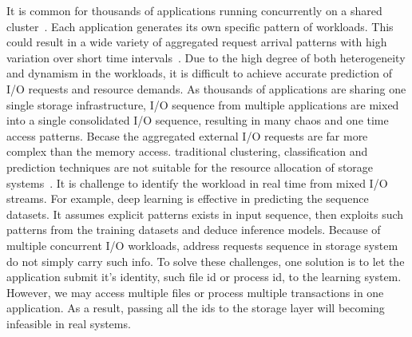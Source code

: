 It is common for thousands of applications running concurrently
on a shared cluster~\cite{stokely2012projecting}.
Each application generates its own specific pattern of workloads.
This could result in a wide variety of aggregated
request arrival patterns with high variation over short time intervals~\cite{reiss2012heterogeneity}.
Due to the high degree of both heterogeneity and dynamism in the workloads,
it is difficult to achieve accurate prediction of I/O requests and resource demands.
As thousands of applications are sharing one single storage infrastructure,
I/O sequence from multiple applications are mixed into a single consolidated I/O sequence,
resulting in many chaos and one time access patterns.
Becase the aggregated external I/O requests are far more complex than the memory access.
traditional clustering, classification and prediction techniques
are not suitable for the resource allocation of storage systems~\cite{ray2017high}.
It is challenge to identify the workload in real time from mixed I/O streams.
For example, deep learning is effective in predicting the sequence datasets.
It assumes explicit patterns exists in input sequence,
then exploits such patterns from the training datasets and deduce inference models.
Because of multiple concurrent I/O workloads,
address requests sequence in storage system do not simply carry such info.
To solve these challenges, one solution is to let the application submit it's identity, such file id or process id, to the learning system.
However, we may access multiple files or process multiple transactions in one application.
As a result, passing all the ids to the storage layer will becoming infeasible in real systems.

